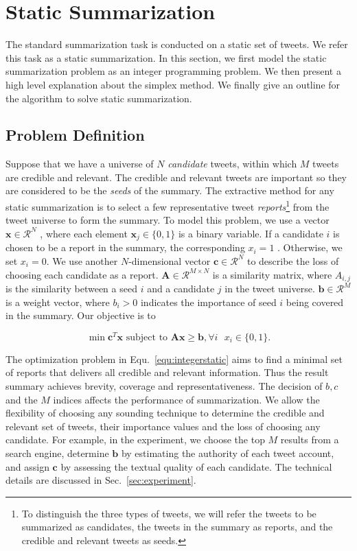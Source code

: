 \documentclass[runningheads]{llncs}
\begin{document}
\section{Static Summarization}\label{sec:static}
%
The standard summarization task is conducted on a static set of tweets. We refer this task as a static summarization. In this section, we first model the static summarization problem as an integer programming problem. We then present a high level explanation about the simplex method. We finally give an outline for the algorithm to solve static summarization.
\subsection{Problem Definition}
Suppose that we have a universe of $N$ \emph{candidate} tweets, within which $M$ tweets are credible and relevant. The credible and relevant tweets are important so they are considered to be the \emph{seeds} of the summary. The extractive method for any static summarization is to select a few representative tweet \emph{reports}\footnote{To distinguish the three types of tweets, we will refer the tweets to be summarized as candidates, the tweets in the summary as reports, and the credible and relevant tweets as seeds.} from the tweet universe to form the summary. To model this problem, we use a vector $\mathbf{x}\in \mathcal{R}^N$ , where each element $\mathbf{x}_j\in \{0,1\}$ is a binary variable. If a candidate  $i$ is chosen to be a report in the summary, the corresponding $x_i=1$ . Otherwise, we set  $x_i=0$. We use another $N$-dimensional vector $\mathbf{c}\in \mathcal{R}^N$ to describe the loss of choosing each candidate as a report. $\mathbf{A}\in\mathcal{R}^{M\times N}$  is a similarity matrix, where $A_{i,j}$  is the similarity between a seed $i$ and a candidate $j$ in the tweet universe. $\mathbf{b}\in \mathcal{R}^{M}$ is a weight vector, where $b_{i}>0$ indicates the importance of seed $i$ being covered in the summary. Our objective is to

\vspace{-0.3cm}
\begin{equation}\label{equ:integerstatic}
\min \mathbf{c}^T \mathbf{x} \textrm{ subject to } \mathbf{A} \mathbf{x} \geq \mathbf{b}, \forall i\textrm{ } x_i\in \{0,1\}.
\end{equation}
\vspace{-0.6cm}

The optimization problem in Equ.~\ref{equ:integerstatic} aims to find a minimal set of reports that delivers all credible and relevant information. Thus the result summary achieves brevity, coverage and representativeness. The decision of $b,c$ and the $M$ indices affects the performance of summarization. We allow the flexibility of choosing any sounding technique to determine the credible and relevant set of tweets, their importance values and the loss of choosing any candidate. For example, in the experiment,  we  choose the top $M$ results from a search engine, determine $\mathbf{b}$  by estimating  the authority of each tweet account, and assign $\mathbf{c}$ by assessing the textual quality of each candidate. The technical details are discussed in Sec.~\ref{sec:experiment}.
\end{document}
